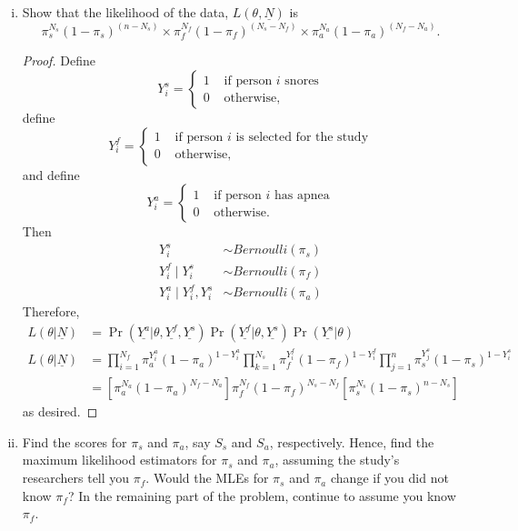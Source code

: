 \documentclass[letterpaper, 12pt]{article}
\begin{document}
\begin{enumerate}[(i)]
\item
Show that the likelihood of the data, $L(\theta, \underline{N})$ is
\[
\pi_s^{N_s}(1-\pi_s)^{(n-N_s)}\times \pi_f^{N_f} (1-\pi_f)^{(N_s-N_f)}\times\pi_a^{N_a}(1-\pi_a)^{(N_f-N_a)}.
\]
\begin{proof}
Define 
\[
Y_{i}^{s}
=
\begin{cases}
1&\text{ if person $i$ snores} \\ 
0&\text{ otherwise,}
\end{cases}
\]
define
\[
Y_{i}^{f}=
\begin{cases}
1&\text{ if person $i$ is selected for the study} \\ 
0&\text{ otherwise,}
\end{cases}
\]
and define
\[
Y_{i}^{a}=
\begin{cases}
1&\text{ if person $i$ has apnea} \\ 
0&\text{ otherwise.}
\end{cases}
\]
Then 
\begin{align*}
Y_{i}^{s} &\sim Bernoulli (\pi_s)
\\
Y_{i}^{f} \mid Y_{i}^{s} &\sim Bernoulli (\pi_f)
\\
Y_{i}^{a} \mid Y_{i}^{f}, Y_{i}^{s} &\sim Bernoulli (\pi_a)
\end{align*}
Therefore, 
\begin{align*}
L(\theta |\underline{N}) 
&=
\Pr (\underline{Y^{a}}|\theta ,\underline{Y^{f}},
\underline{Y^{s}})\Pr (\underline{Y^{f}}|\theta ,\underline{Y^{s}})\Pr (\underline{Y^{s}%
}|\theta ) 
\\
L(\theta |\underline{N}) 
&=
\prod\limits_{i=1}^{N_{f}}\pi
_{a}^{Y_{i}^{a}}(1-\pi _{a})^{1-Y_{i}^{a}}\prod\limits_{k=1}^{N_{s}}\pi
_{f}^{Y_{i}^{f}}(1-\pi _{f})^{1-Y_{i}^{f}}\prod\limits_{j=1}^{n}\pi
_{s}^{Y_{j}^{s}}(1-\pi _{s})^{1-Y_{i}^{s}} 
\\
&=\left[ \pi _{a}^{N_{a}}(1-\pi _{a})^{N_{f}-N_{a}}\right] \pi
_{f}^{N_{f}}(1-\pi _{f})^{N_{s}-N_{f}}\left[ \pi _{s}^{N_{s}}(1-\pi
_{s})^{n-N_{s}}\right] 
\end{align*}
as desired.
\end{proof}
\item
Find the scores for $\pi_s$ and $\pi_a$, say $S_s$ and $S_a$, respectively. Hence, find the maximum likelihood estimators for $\pi_s$ and $\pi_a$, assuming the study's researchers tell you $\pi_f$. Would the MLEs for $\pi_s$ and $\pi_a$ change if you did not know $\pi_f$? In the remaining part of the problem, continue to assume you know $\pi_f$.

\end{enumerate}
\end{document}
